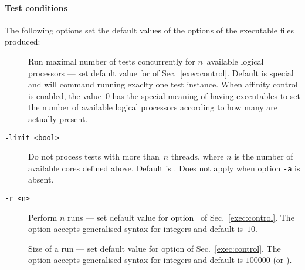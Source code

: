 \paragraph*{Test conditions\label{litmus:option:sec}}
The following options set the default values of
the options of the executable files produced:
\begin{description}
\item[]Run maximal number of tests concurrently for $n$~available
logical processors ---
set default value for  of Sec.~\ref{exec:control}.
Default is special and will command running exaclty one test instance.
When affinity control is enabled, the value~$0$ has the special
meaning of having executables to set the
number of available logical processors according to
how many are actually present.
\item[{\tt -limit <bool>}] Do not process tests with more than~$n$
threads, where $n$ is the number of available cores defined above.
Default is .  Does not apply when option \texttt{-a} is absent.
\item[{\tt -r <n>}] Perform $n$ runs --- set default value for
option~ of Sec.~\ref{exec:control}.
The option accepts generalised syntax for integers and
default is~$10$.
\item[]Size of a run --- set default value for
option  of Sec.~\ref{exec:control}.
The option accepts generalised syntax for integers and
default is $100000$ (or ).
\end{description}


